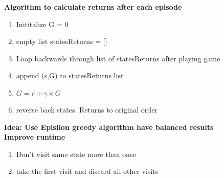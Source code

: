 \documentclass{article}
\begin{document}
\begin{enumerate}
\textbf{Algorithm to calculate returns after each episode}
\begin{enumerate}
\item Inititalize G = 0
\item empty list statesReturns = []
\item Loop backwards through list of statesReturns after playing game
\item append (s,G) to statesReturns list
\item $G = r + \gamma \times G$
\item reverse back states. Returns to original order
\end{enumerate}

\end{enumerate}


\textbf{Idea: Use Episilon greedy algorithm have balanced results} \\

\textbf{Improve runtime}
\begin{enumerate}
\item Don't visit same state more than once
\item take the first visit and discard all other visits
\end{enumerate}
\end{document}
